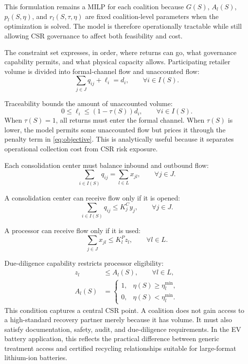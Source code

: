 This formulation remains a MILP for each coalition because $G(S)$, $A_l(S)$, $p_l(S,\eta)$, and $r_l(S,\tau,\eta)$ are fixed coalition-level parameters when the optimization is solved. The model is therefore operationally tractable while still allowing CSR governance to affect both feasibility and cost.

The constraint set expresses, in order, where returns can go, what governance capability permits, and what physical capacity allows. Participating retailer volume is divided into formal-channel flow and unaccounted flow:
\begin{equation}
\label{eq:con_retailer}
\sum_{j\in J} q_{ij}+\ell_i=d_i,
\qquad \forall i\in I(S).
\end{equation}

Traceability bounds the amount of unaccounted volume:
\begin{equation}
\label{eq:con_leakage}
0\leq \ell_i\leq \left(1-\tau(S)\right)d_i,
\qquad \forall i\in I(S).
\end{equation}
When $\tau(S)=1$, all returns must enter the formal channel. When $\tau(S)$ is lower, the model permits some unaccounted flow but prices it through the penalty term in \eqref{eq:objective}. This is analytically useful because it separates operational collection cost from CSR risk exposure.

Each consolidation center must balance inbound and outbound flow:
\begin{equation}
\label{eq:con_consolidation}
\sum_{i\in I(S)} q_{ij}=\sum_{l\in L}x_{jl},
\qquad \forall j\in J.
\end{equation}

A consolidation center can receive flow only if it is opened:
\begin{equation}
\label{eq:con_cap_c}
\sum_{i\in I(S)}q_{ij}\leq K_j^C y_j,
\qquad \forall j\in J.
\end{equation}

A processor can receive flow only if it is used:
\begin{equation}
\label{eq:con_cap_p}
\sum_{j\in J}x_{jl}\leq K_l^P z_l,
\qquad \forall l\in L.
\end{equation}

Due-diligence capability restricts processor eligibility:
\begin{align}
\label{eq:con_processor_access}
z_l&\leq A_l(S),
\qquad \forall l\in L,\\
\label{eq:con_processor_eligibility}
A_l(S)&=
\begin{cases}
1, & \eta(S)\geq \eta_l^{\min},\\
0, & \eta(S)<\eta_l^{\min}.
\end{cases}
\end{align}
This condition captures a central CSR point. A coalition does not gain access to a high-standard recovery partner merely because it has volume. It must also satisfy documentation, safety, audit, and due-diligence requirements. In the EV battery application, this reflects the practical difference between generic treatment access and certified recycling relationships suitable for large-format lithium-ion batteries.


